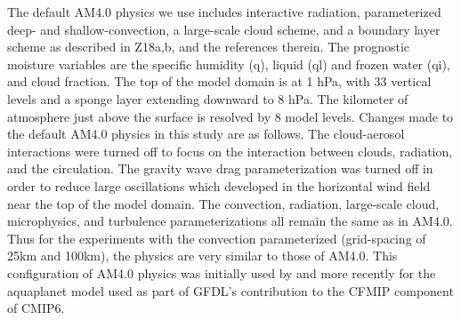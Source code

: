 \documentclass[draft]{agujournal2019}
\begin{document}
The default AM4.0 physics we use includes interactive radiation, parameterized deep- and shallow-convection, 
a large-scale cloud scheme, and a boundary layer 
scheme as described in Z18a,b, and the references therein.  The prognostic moisture variables are the specific 
humidity (q), liquid (ql) and frozen water (qi), and cloud fraction.  The top of the model domain is at 1 hPa, with 33 vertical 
levels and a sponge layer extending downward to 8 hPa.  The kilometer of atmosphere just above the surface is resolved by 
8 model levels.  Changes made to the default AM4.0 physics in this study are as follows.  The cloud-aerosol 
interactions were turned off to focus on the interaction between clouds, radiation, and the circulation.  The gravity wave drag 
parameterization was turned off 
in order to reduce large oscillations which developed in the horizontal wind field near the top of the model domain.  
The convection, radiation, large-scale cloud, microphysics, and turbulence parameterizations all remain the same 
as in AM4.0.   Thus for the experiments with the convection parameterized (grid-spacing of 25km and 100km), the 
physics are very similar to those of AM4.0.  
This configuration of AM4.0 physics was initially used by  and more recently for the aquaplanet model
used as part of GFDL's contribution to the CFMIP component of CMIP6.  

%
%
\end{document}
